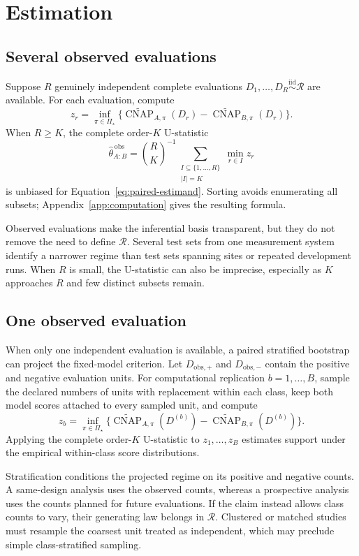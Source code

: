 \documentclass[11pt]{article}
\newcommand{\CNAP}{\operatorname{CNAP}}
\newcommand{\Regime}{\mathcal{R}}
\newcommand{\PSet}{\Pi_\star}
\newcommand{\iid}{\mathrel{\overset{\mathrm{iid}}{\sim}}}
\newcommand{\CNAPta}{\widetilde{\CNAP}}
\theoremstyle{remark}
\begin{document}
\section{Estimation}
\label{sec:estimation}

\subsection{Several observed evaluations}

Suppose $R$ genuinely independent complete evaluations $D_1,\ldots,D_R\iid\Regime$ are available. For each evaluation, compute
\[
z_r
=
\inf_{\pi\in\PSet}
\{\CNAPta_{A,\pi}(D_r)-\CNAPta_{B,\pi}(D_r)\}.
\]
When $R\geq K$, the complete order-$K$ U-statistic \cite{hoeffding1948ustat}
\begin{equation}
\widehat\theta_{A:B}^{\,\mathrm{obs}}
=
\binom RK^{-1}
\sum_{\substack{I\subseteq\{1,\ldots,R\}\\|I|=K}}
\min_{r\in I}z_r
\label{eq:observed-u}
\end{equation}
is unbiased for Equation~\eqref{eq:paired-estimand}. Sorting avoids enumerating all subsets; Appendix~\ref{app:computation} gives the resulting formula.

Observed evaluations make the inferential basis transparent, but they do not remove the need to define $\Regime$. Several test sets from one measurement system identify a narrower regime than test sets spanning sites or repeated development runs. When $R$ is small, the U-statistic can also be imprecise, especially as $K$ approaches $R$ and few distinct subsets remain.

\subsection{One observed evaluation}

When only one independent evaluation is available, a paired stratified bootstrap can project the fixed-model criterion. Let $D_{\mathrm{obs},+}$ and $D_{\mathrm{obs},-}$ contain the positive and negative evaluation units. For computational replication $b=1,\ldots,B$, sample the declared numbers of units with replacement within each class, keep both model scores attached to every sampled unit, and compute
\[
z_b
=
\inf_{\pi\in\PSet}
\{\CNAPta_{A,\pi}(D^{(b)})-\CNAPta_{B,\pi}(D^{(b)})\}.
\]
Applying the complete order-$K$ U-statistic to $z_1,\ldots,z_B$ estimates support under the empirical within-class score distributions.

Stratification conditions the projected regime on its positive and negative counts. A same-design analysis uses the observed counts, whereas a prospective analysis uses the counts planned for future evaluations. If the claim instead allows class counts to vary, their generating law belongs in $\Regime$. Clustered or matched studies must resample the coarsest unit treated as independent, which may preclude simple class-stratified sampling.
\end{document}
